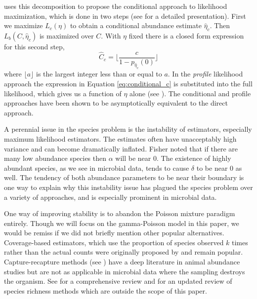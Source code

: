 \documentclass[oupdraft]{bio}
\begin{document}
\citet{sanathanan_1977} uses this decomposition to propose the conditional approach to likelihood maximization, which is done in two steps (see \citet{chao_2002} for a detailed presentation).  First we maximize $L_c(\eta)$ to obtain a conditional abundance estimate $\widehat{\eta}_c$.  Then $L_b(C, \widehat{\eta}_c)$ is maximized over $C$.  With $\eta$ fixed there is a closed form expression for this second step,
\begin{equation} 
\widehat{C}_c = \Biggl\lfloor \frac{c}{1-p_{\widehat{\eta}_c}(0)} \Biggr\rfloor \label{eq:conditional_c} 
\end{equation}
where $\lfloor a \rfloor$ is the largest integer less than or equal to $a$.  In the \textit{profile} likelihood approach the expression in Equation \ref{eq:conditional_c} is substituted into the full likelihood, which gives us a function of $\eta$ alone (see \citet{wang_2005}).  The conditional and profile approaches have been shown to be asymptotically equivalent to the direct approach.

A perennial issue in the species problem is the instability of estimators, especially maximum likelihood estimators.  The estimates often have unacceptably high variance and can become dramatically inflated.  Fisher noted that if there are many low abundance species then $\alpha$ will be near 0.  The existence of highly abundant species, as we see in microbial data, tends to cause $\delta$ to be near 0 as well.  The tendency of both abundance parameters to be near their boundary is one way to explain why this instability issue has plagued the species problem over a variety of approaches, and is especially prominent in microbial data.

One way of improving stability is to abandon the Poisson mixture paradigm entirely.  Though we will focus on the gamma-Poisson model in this paper, we would be remiss if we did not briefly mention other popular alternatives.  Coverage-based estimators, which use the proportion of species observed $k$ times rather than the actual counts were originally proposed by \citet{good_1953} and remain popular.  Capture-recapture methods (see \citet{chao_1987}) have a deep literature in animal abundance studies but are not as applicable in microbial data where the sampling  destroys the organism.  See \citet{bunge_1993} for a comprehensive review and \citet{bunge_2014} for an updated review of species richness methods which are outside the scope of this paper. 
\end{document}
